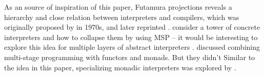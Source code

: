 As an source of inspiration of this paper, Futamura projections
reveals a hierarchy and close relation between interpreters and
compilers, which was originally proposed by
\citeauthor{futamura1971partial} in 1970s\cite{futamura1971partial},
and later reprinted \cite{Futamura1999}.
\citeauthor{Amin:2017:CTI:3177123.3158140} consider a tower of
concrete interpreters and how to collapse them by using MSP -- it
would be interesting to explore this idea for multiple layers of
abstract interpreters \cite{Cousot:2019:AAI:3302515.3290355,
  Giacobazzi:2015:APA:2676726.2676987}.  \citet{10.1007/11561347_18}
discussed combining multi-stage programming with functors and
monads. But they didn't   Similar to the idea
in this paper, specializing monadic interpreters was explored by
\citet{DBLP:conf/dsl/SheardBP99, danvy1991compiling}. 
